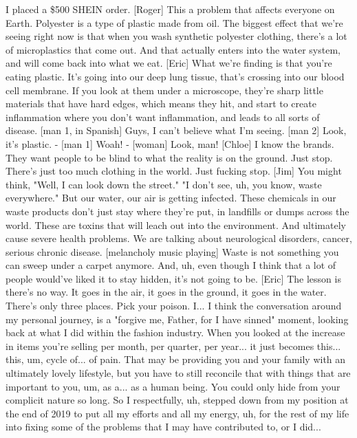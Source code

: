 \documentclass[a4paper]{article}
\begin{document}
	I placed a \$500 SHEIN order.
	[Roger] This a problem that affects everyone on Earth.
	Polyester is a type of plastic made from oil.
	The biggest effect that we're seeing right now
	is that when you wash synthetic polyester clothing,
	there's a lot of microplastics that come out.
	And that actually enters into the water system,
	and will come back into what we eat.
	[Eric] What we're finding is that you're eating plastic.
	It's going into our deep lung tissue,
	that's crossing into our blood cell membrane.
	If you look at them under a microscope, they're sharp little materials
	that have hard edges, which means they hit,
	and start to create inflammation where you don't want inflammation,
	and leads to all sorts of disease.
	[man 1, in Spanish] Guys, I can't believe what I'm seeing.
	[man 2] Look, it's plastic.
	- [man 1] Woah! - [woman] Look, man!
	[Chloe] I know the brands. They want people to be blind to
	what the reality is on the ground.
	Just stop. There's just too much clothing in the world.
	Just fucking stop.
	[Jim] You might think, "Well, I can look down the street."
	"I don't see, uh, you know, waste everywhere."
	But our water, our air is getting infected.
	These chemicals in our waste products
	don't just stay where they're put, in landfills or dumps across the world.
	These are toxins that will leach out into the environment.
	And ultimately cause severe health problems.
	We are talking about neurological disorders,
	cancer, serious chronic disease.
	[melancholy music playing]
	Waste is not something you can sweep under a carpet anymore.
	And, uh, even though I think that
	a lot of people would've liked it to stay hidden, it's not going to be.
	[Eric] The lesson is there's no way.
	It goes in the air, it goes in the ground, it goes in the water.
	There's only three places.
	Pick your poison.
	I... I think the conversation around my personal journey,
	is a "forgive me, Father, for I have sinned" moment,
	looking back at what I did within the fashion industry.
	When you looked at the increase in
	items you're selling per month, per quarter, per year...
	it just becomes this...
	this, um, cycle of... of pain.
	That may be providing you and your family with an ultimately lovely lifestyle,
	but you have to still reconcile that with things that are important to you,
	um, as a... as a human being.
	You could only hide from your complicit nature so long.
	So I respectfully, uh, stepped down from my position at the end of 2019
	to put all my efforts and all my energy, uh,
	for the rest of my life into fixing some of the problems
	that I may have contributed to, or I did...
\end{document}
